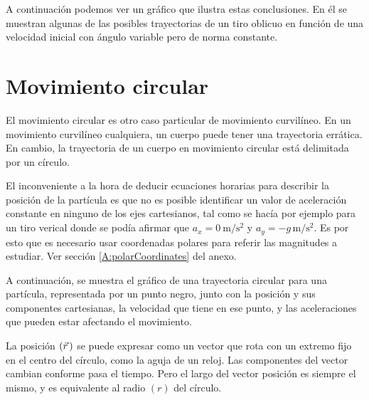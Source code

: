 \documentclass[a5paper,12pt,twoside]{book}
\begin{document}
A continuación podemos ver un gráfico que ilustra estas conclusiones. En él se muestran algunas de las posibles trayectorias de un tiro oblicuo en función de una velocidad inicial con ángulo variable pero de norma constante.

\begin{center}
    \vspace{-5cm}
    \def\svgwidth{\linewidth}
    
    \vspace{-6cm}
\end{center}


\section{Movimiento circular}
\label{sec:circularMotion}

El movimiento circular es otro caso particular de movimiento curvilíneo. En un movimiento curvilíneo cualquiera, un cuerpo puede tener una trayectoria errática. En cambio, la trayectoria de un cuerpo en movimiento circular está delimitada por un círculo.

El inconveniente a la hora de deducir ecuaciones horarias para describir la posición de la partícula es que no es posible identificar un valor de aceleración constante en ninguno de los ejes cartesianos, tal como se hacía por ejemplo para un tiro verical donde se podía afirmar que $a_x=\SI{0}{\metre\per\second^2}$ y $a_y=-g\,\si{\metre\per\second^2}$. Es por esto que es necesario usar {coordenadas polares} para referir las magnitudes a estudiar. Ver sección \ref{A:polarCoordinates} del anexo.

A continuación, se muestra el gráfico de una trayectoria circular para una partícula, representada por un punto negro, junto con la posición y sus componentes cartesianas, la velocidad que tiene en ese punto, y las aceleraciones que pueden estar afectando el movimiento.

\begin{center}
    \vspace{-5cm}
    \def\svgwidth{\linewidth}
    
    \vspace{-6cm}
\end{center}

La posición $(\vec{r}\hspace{0.05cm})$ se puede expresar como un vector que rota con un extremo fijo en el centro del círculo, como la aguja de un reloj. Las componentes del vector cambian conforme pasa el tiempo. Pero el largo del vector posición es siempre el mismo, y es equivalente al radio $(r)$ del círculo.
\end{document}
